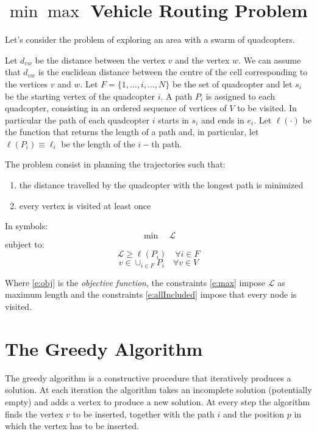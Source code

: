 \section{$\min \max$ Vehicle Routing Problem}
\label{s:vrp}

Let's consider the problem of exploring an area with a swarm of quadcopters.


Let $d_{vw}$ be the distance between the vertex $v$ and the vertex $w$.
We can assume that $d_{vw}$ is the euclidean distance between the centre of the cell corresponding to the vertices  $v$ and $w$.
Let $F = \{ 1, \ldots, i, \ldots, N\}$ be the set of quadcopter and let $s_i$ be the starting vertex  of the quadcopter $i$.
A path $P_i$ is assigned to each quadcopter, consisting in an ordered sequence of vertices of $V$ to be visited.
In particular the path of each quadcopter $i$ starts in $s_i$ and ends in $e_i$.
Let $\ell(\cdot)$ be the function that returns the length of a path and, in particular, let $\ell(P_i) \equiv \ell_i$ be the length of the $i-$th path.

The problem consist in planning the trajectories such that:

\begin{enumerate}[label=\textbf{\arabic*.}]
\item the distance travelled by  the quadcopter with the longest path is minimized

\item every vertex is visited at least once
\end{enumerate}

In symbols:
\begin{equation}
\min \quad \mathcal{L} \label{e:obj}
\end{equation}
subject to:
\begin{equation}
\mathcal{L} \geq \ell(P_i) \quad \forall i \in F \label{e:max}
\end{equation}
\begin{equation}
v \in \cup_{i \in F} P_i \quad \forall v \in V \label{e:allIncluded}
\end{equation}


Where \eqref{e:obj} is the \textit{objective function},
the constraints \eqref{e:max} impose $\mathcal{L}$ as maximum length and
the constraints \eqref{e:allIncluded} impose that every node is visited.

\section{The Greedy Algorithm}
\label{s:greedy}
The greedy algorithm is a constructive procedure that iteratively produces a solution.
At each iteration the algorithm takes an incomplete solution (potentially empty) and adds a vertex to produce a new solution.
At every step the algorithm finds the vertex $v$ to be inserted, together with the path $i$ and the position $p$ in which the vertex has to be inserted.

